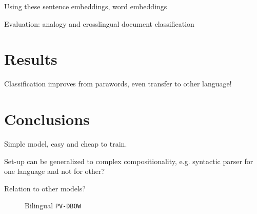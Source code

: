 \documentclass[a4paper,11pt]{article}
\begin{document}
Using these sentence embeddings, word embeddings 



Evaluation: analogy and crosslingual document classification
\cite{klementiev2012inducing}


\section*{Results}

Classification improves from parawords, even transfer to other language!



\section*{Conclusions}
Simple model, easy and cheap to train. 

Set-up can be generalized to complex compositionality, e.g. syntactic parser for one language and not for other?

Relation to other models?


\begin{figure}

\center

\caption{Bilingual {\tt PV-DBOW}}
\label{f:bilingual_dbow}
\end{figure}








\end{document}
